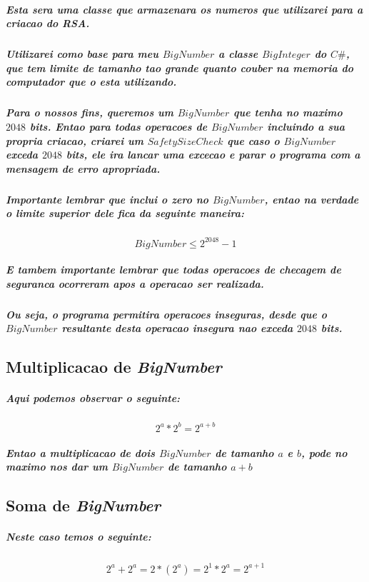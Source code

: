 \documentclass[12pt,twoside, a4paper, twocolumn]{article}
\begin{document}
\subparagraph*{Esta sera uma classe que armazenara os numeros que utilizarei para a criacao do RSA. }
\subparagraph*{Utilizarei como base para meu $BigNumber$ a classe $BigInteger$ do $C\#$, que tem limite de tamanho tao grande quanto couber na memoria do computador que o esta utilizando.}
\subparagraph*{Para o nossos fins, queremos um $BigNumber$ que tenha no maximo $2048$ bits. Entao para todas operacoes de $BigNumber$ incluindo a sua propria criacao, criarei um $SafetySizeCheck$ que caso o $BigNumber$ exceda $2048$ bits, ele ira lancar uma excecao e parar o programa com a mensagem de erro apropriada.}
\subparagraph*{Importante lembrar que inclui o zero no $BigNumber$, entao na verdade o limite superior dele fica da seguinte maneira:}

\begin{equation}
    BigNumber \le 2^{2048} - 1
\end{equation}

\subparagraph*{E tambem importante lembrar que todas operacoes de checagem de seguranca ocorreram \emph{apos} a operacao ser realizada.}

\subparagraph*{Ou seja, o programa permitira operacoes inseguras, desde que o $BigNumber$ resultante desta operacao insegura nao exceda $2048$ bits.}

\subsection{Multiplicacao de \emph{BigNumber}}

\subparagraph*{Aqui podemos observar o seguinte:}

\begin{equation}
    2^a * 2^b = 2^{a + b}
\end{equation}

\subparagraph*{Entao a multiplicacao de dois $BigNumber$ de tamanho $a$ e $b$, pode no maximo nos dar um $BigNumber$ de tamanho $a+b$}

\subsection{Soma de \emph{BigNumber}}

\subparagraph*{Neste caso temos o seguinte:}

\begin{equation}
    \begin{aligned}
        2^a + 2^a = 2*(2^a) = 2^1 * 2^a = 2^{a + 1}
    \end{aligned}
\end{equation}
\end{document}
